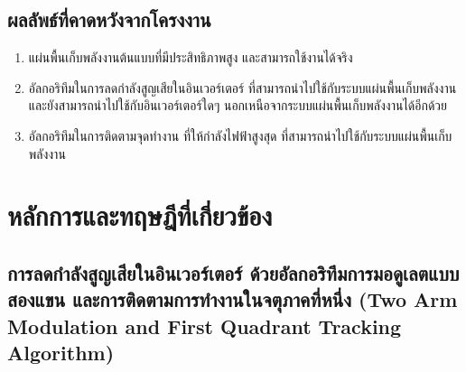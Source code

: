 \documentclass[11pt,a4paper]{article}
\begin{document}

\subsection{ผลลัพธ์ที่คาดหวังจากโครงงาน}


\begin{enumerate}
    \item แผ่นพื้นเก็บพลังงานต้นแบบที่มีประสิทธิภาพสูง และสามารถใช้งานได้จริง
    \item อัลกอริทึมในการลดกำลังสูญเสียในอินเวอร์เตอร์ ที่สามารถนำไปใช้กับระบบแผ่นพื้นเก็บพลังงาน และยังสามารถนำไปใช้กับอินเวอร์เตอร์ใดๆ นอกเหนือจากระบบแผ่นพื้นเก็บพลังงานได้อีกด้วย
    \item อัลกอริทึมในการติดตามจุดทำงาน ที่ให้กำลังไฟฟ้าสูงสุด ที่สามารถนำไปใช้กับระบบแผ่นพื้นเก็บพลังงาน
\end{enumerate}






\section{หลักการและทฤษฎีที่เกี่ยวข้อง}

\subsection{การลดกำลังสูญเสียในอินเวอร์เตอร์ ด้วยอัลกอริทึมการมอดูเลตแบบสองแขน และการติดตามการทำงานในจตุภาคที่หนึ่ง (Two Arm Modulation and First Quadrant Tracking Algorithm)}
\end{document}
